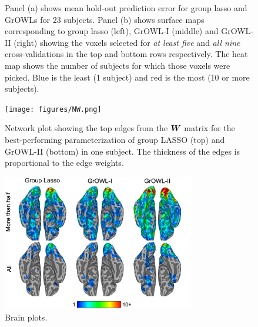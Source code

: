 \begin{figure}[!t]
\centering
{}
\hfil
{}
\caption{Panel (a) shows mean hold-out prediction error for group lasso and GrOWLs for 23 subjects. Panel (b) shows surface maps corresponding to group lasso (left), GrOWL-I (middle) and GrOWL-II (right) showing the voxels selected for \textit{at least five} and \textit{all nine} cross-validations in the top and bottom rows respectively. The heat map shows the number of subjects for which those voxels were picked. Blue is the least (1 subject) and red is the most (10 or more subjects).}
\label{fig.error}
\end{figure}

\begin{figure}[!t]
\centering
\texttt{[image: figures/NW.png]}%
\caption{Network plot showing the top edges from the $\boldsymbol{W}$ matrix for the best-performing parameterization of group LASSO (top) and GrOWL-II (bottom) in one subject. The thickness of the edges is proportional to the edge weights.}
\label{fig.NW}
\end{figure}


\iffalse
\begin{figure}[!t]
\centering
\includegraphics[width=0.75\textwidth]{figures/brain_final.png}%
\caption{Brain plots.}
\label{fig.brain}
\end{figure}

